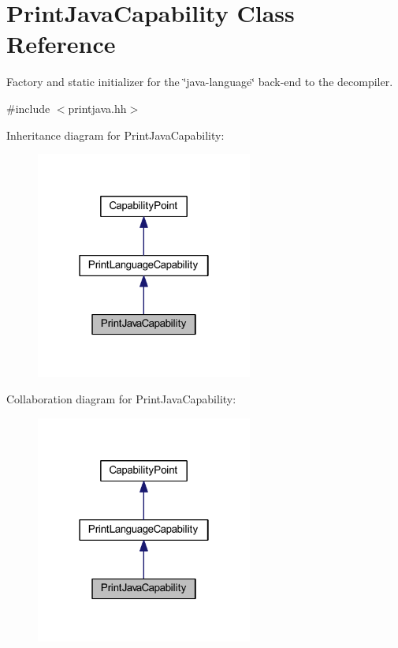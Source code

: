 \hypertarget{class_print_java_capability}{}\section{Print\+Java\+Capability Class Reference}
\label{class_print_java_capability}


Factory and static initializer for the \char`\"{}java-\/language\char`\"{} back-\/end to the decompiler.  




{\ttfamily \#include $<$printjava.\+hh$>$}



Inheritance diagram for Print\+Java\+Capability\+:
\nopagebreak
\begin{figure}[H]
\begin{center}
\leavevmode
\includegraphics[width=202pt]{class_print_java_capability__inherit__graph}
\end{center}
\end{figure}


Collaboration diagram for Print\+Java\+Capability\+:
\nopagebreak
\begin{figure}[H]
\begin{center}
\leavevmode
\includegraphics[width=202pt]{class_print_java_capability__coll__graph}
\end{center}
\end{figure}
